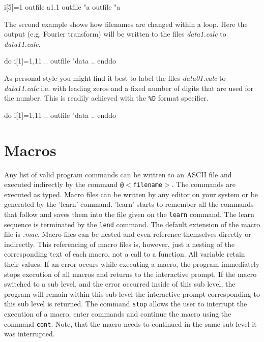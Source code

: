 \begin{MacVerbatim}
     i[5]=1
     outfile a1.1
     outfile "a%
     outfile "a%
\end{MacVerbatim}

The second example shows how filenames are changed within a loop.
Here the output (e.g. Fourier transform) will be written to the
files {\it data1.calc} to {\it data11.calc}.

\begin{MacVerbatim}
     do i[1]=1,11
       ..
       outfile "data%
       ..
     enddo
\end{MacVerbatim}

As personal style you might find it best to label the files 
{\it data01.calc} to {\it data11.calc} i.e. with leading zeros 
and a fixed number of digits that are used for the number.
This is readily achieved with the {\tt \%D} format specifier.

\begin{MacVerbatim}
     do i[1]=1,11
       ..
       outfile "data%
       ..
     enddo
\end{MacVerbatim}

\section{Macros \label{mac}}

Any list of valid program commands can be written to an ASCII
file and executed indirectly by the command {\tt @$<$filename$>$}.
The commands are executed as typed.  Macro files can be written by any
editor on your system or be generated by the 'learn' command.
'learn' starts to remember all the commands that follow and saves
them into the file given on the {\tt learn} command.  The learn
sequence is terminated by the {\tt lend} command.  The default
extension of the macro file is {\it .mac}.  Macro files can be
nested and even reference themselves directly or indirectly.  This
referencing of macro files is, however, just a nesting of the
corresponding text of each macro, not a call to a function.  All
variable retain their values.  If an error occurs while executing a
macro, the program immediately stops execution of all macros and
returns to the interactive prompt.  If the macro switched to a
sub level, and the error occurred inside of this sub level, the program
will remain within this sub level the interactive prompt
corresponding to this sub level is returned. The command {\tt stop}
allows the user to interrupt the execution of a macro, enter
commands and continue the macro using the command {\tt cont}. Note,
that the macro needs to continued in the same sub level it was
interrupted.
\par

